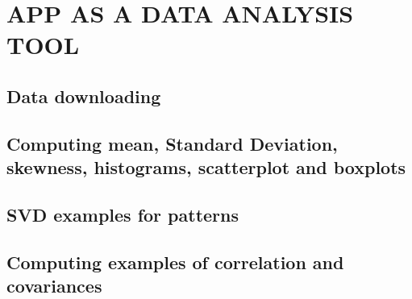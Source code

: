 \chapter{APP AS A DATA ANALYSIS TOOL}
\label{chap:conclusion}

\section{Data downloading}

\section{Computing mean, Standard Deviation, skewness, histograms, scatterplot and boxplots}


\section{SVD examples for patterns}

\section{Computing examples of correlation and covariances}

